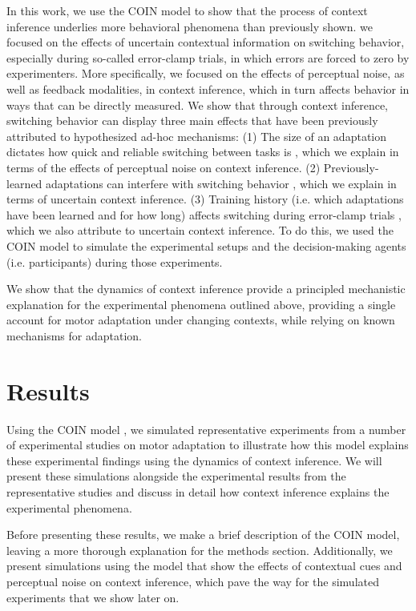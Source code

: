 \documentclass[a4paper,doc,floatsintext,natbib]{apa6}
\begin{document}
In this work, we use the COIN model to show that the process of context inference underlies more behavioral phenomena than previously shown. we focused on the effects of uncertain contextual information on switching behavior, especially during so-called error-clamp trials, in which errors are forced to zero by experimenters. More specifically, we focused on the effects of perceptual noise, as well as feedback modalities, in context inference, which in turn affects behavior in ways that can be directly measured. We show that through context inference, switching behavior can display three main effects that have been previously attributed to hypothesized ad-hoc mechanisms: (1) The size of an adaptation dictates how quick and reliable switching between tasks is \cite{Oh_Minimizing_2019,Kim_Neural_2015}, which we explain in terms of the effects of perceptual noise on context inference. (2) Previously-learned adaptations can interfere with switching behavior \citep{Davidson_Scaling_2004}, which we explain in terms of uncertain context inference. (3) Training history (i.e. which adaptations have been learned and for how long) affects switching during error-clamp trials \citep{Vaswani_Decay_2013}, which we also attribute to uncertain context inference. To do this, we used the COIN model to simulate the experimental setups and the decision-making agents (i.e. participants) during those experiments.

We show that the dynamics of context inference provide a principled mechanistic explanation for the experimental phenomena outlined above, providing a single account for motor adaptation under changing contexts, while relying on known mechanisms for adaptation.

\section{Results}
Using the COIN model \citep{Heald_Contextual_2021}, we simulated representative experiments from a number of experimental studies on motor adaptation to illustrate how this model explains these experimental findings using the dynamics of context inference. We will present these simulations alongside the experimental results from the representative studies and discuss in detail how context inference explains the experimental phenomena.

Before presenting these results, we make a brief description of the COIN model, leaving a more thorough explanation for the methods section. Additionally, we present simulations using the model that show the effects of contextual cues and perceptual noise on context inference, which pave the way for the simulated experiments that we show later on.
\end{document}
